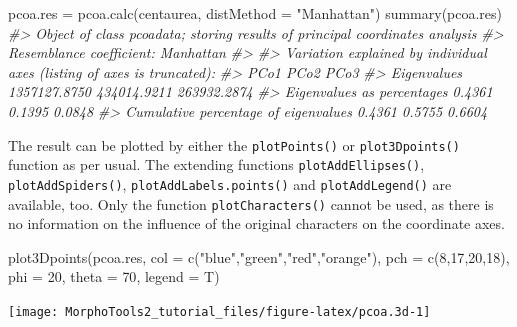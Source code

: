 \documentclass[
  11pt,
  a4paper]{article}
\newenvironment{Shaded}{\begin{snugshade}}{\end{snugshade}}
\newcommand{\AttributeTok}[1]{\textcolor[rgb]{0.77,0.63,0.00}{#1}}
\newcommand{\CommentTok}[1]{\textcolor[rgb]{0.56,0.35,0.01}{\textit{#1}}}
\newcommand{\DecValTok}[1]{\textcolor[rgb]{0.00,0.00,0.81}{#1}}
\newcommand{\FunctionTok}[1]{\textcolor[rgb]{0.00,0.00,0.00}{#1}}
\newcommand{\NormalTok}[1]{#1}
\newcommand{\OtherTok}[1]{\textcolor[rgb]{0.56,0.35,0.01}{#1}}
\newcommand{\StringTok}[1]{\textcolor[rgb]{0.31,0.60,0.02}{#1}}
\begin{document}
\begin{Shaded}
\begin{Highlighting}[]
\NormalTok{pcoa.res }\OtherTok{=} \FunctionTok{pcoa.calc}\NormalTok{(centaurea, }\AttributeTok{distMethod =} \StringTok{"Manhattan"}\NormalTok{)}
\FunctionTok{summary}\NormalTok{(pcoa.res)}
\CommentTok{\#\textgreater{} Object of class \textquotesingle{}pcoadata\textquotesingle{}; storing results of principal coordinates analysis}
\CommentTok{\#\textgreater{} Resemblance coefficient:  Manhattan }
\CommentTok{\#\textgreater{} }
\CommentTok{\#\textgreater{} Variation explained by individual axes (listing of axes is truncated):}
\CommentTok{\#\textgreater{}                                              PCo1        PCo2        PCo3}
\CommentTok{\#\textgreater{} Eigenvalues                          1357127.8750 434014.9211 263932.2874}
\CommentTok{\#\textgreater{} Eigenvalues as percentages                 0.4361      0.1395      0.0848}
\CommentTok{\#\textgreater{} Cumulative percentage of eigenvalues       0.4361      0.5755      0.6604}
\end{Highlighting}
\end{Shaded}

The result can be plotted by either the \texttt{plotPoints()} or
\texttt{plot3Dpoints()} function as per usual. The extending functions
\texttt{plotAddEllipses()}, \texttt{plotAddSpiders()},
\texttt{plotAddLabels.points()} and \texttt{plotAddLegend()} are
available, too. Only the function \texttt{plotCharacters()} cannot be
used, as there is no information on the influence of the original
characters on the coordinate axes.

\begin{Shaded}
\begin{Highlighting}[]
\FunctionTok{plot3Dpoints}\NormalTok{(pcoa.res, }\AttributeTok{col =} \FunctionTok{c}\NormalTok{(}\StringTok{"blue"}\NormalTok{,}\StringTok{"green"}\NormalTok{,}\StringTok{"red"}\NormalTok{,}\StringTok{"orange"}\NormalTok{), }\AttributeTok{pch =} \FunctionTok{c}\NormalTok{(}\DecValTok{8}\NormalTok{,}\DecValTok{17}\NormalTok{,}\DecValTok{20}\NormalTok{,}\DecValTok{18}\NormalTok{), }
             \AttributeTok{phi =} \DecValTok{20}\NormalTok{, }\AttributeTok{theta =} \DecValTok{70}\NormalTok{, }\AttributeTok{legend =}\NormalTok{ T)}
\end{Highlighting}
\end{Shaded}

\begin{center}\texttt{[image: MorphoTools2\_tutorial\_files/figure-latex/pcoa.3d-1]} \end{center}
\end{document}
